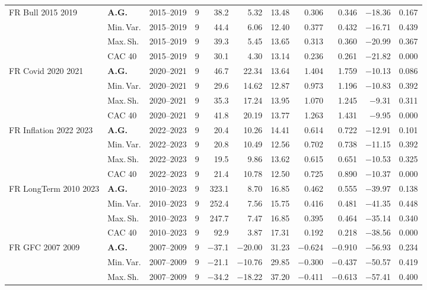 \begin{longtable}{p{2.6cm} l c c r r r r r r r}
FR Bull 2015 2019 & \textbf{A.G.} & 2015--2019 & 9 & 38.2 & 5.32 & 13.48 & 0.306 & 0.346 & $-$18.36 & 0.167 \\
 & Min.\,Var. & 2015--2019 & 9 & 44.4 & 6.06 & 12.40 & 0.377 & 0.432 & $-$16.71 & 0.439 \\
 & Max.\,Sh. & 2015--2019 & 9 & 39.3 & 5.45 & 13.65 & 0.313 & 0.360 & $-$20.99 & 0.367 \\
 & CAC 40 & 2015--2019 & 9 & 30.1 & 4.30 & 13.14 & 0.236 & 0.261 & $-$21.82 & 0.000 \\
\midrule
FR Covid 2020 2021 & \textbf{A.G.} & 2020--2021 & 9 & 46.7 & 22.34 & 13.64 & 1.404 & 1.759 & $-$10.13 & 0.086 \\
 & Min.\,Var. & 2020--2021 & 9 & 29.6 & 14.62 & 12.87 & 0.973 & 1.196 & $-$10.83 & 0.392 \\
 & Max.\,Sh. & 2020--2021 & 9 & 35.3 & 17.24 & 13.95 & 1.070 & 1.245 & $-$9.31 & 0.311 \\
 & CAC 40 & 2020--2021 & 9 & 41.8 & 20.19 & 13.77 & 1.263 & 1.431 & $-$9.95 & 0.000 \\
\midrule
FR Inflation 2022 2023 & \textbf{A.G.} & 2022--2023 & 9 & 20.4 & 10.26 & 14.41 & 0.614 & 0.722 & $-$12.91 & 0.101 \\
 & Min.\,Var. & 2022--2023 & 9 & 20.8 & 10.49 & 12.56 & 0.702 & 0.738 & $-$11.15 & 0.392 \\
 & Max.\,Sh. & 2022--2023 & 9 & 19.5 & 9.86 & 13.62 & 0.615 & 0.651 & $-$10.53 & 0.325 \\
 & CAC 40 & 2022--2023 & 9 & 21.4 & 10.78 & 12.50 & 0.725 & 0.890 & $-$10.37 & 0.000 \\
\midrule
FR LongTerm 2010 2023 & \textbf{A.G.} & 2010--2023 & 9 & 323.1 & 8.70 & 16.85 & 0.462 & 0.555 & $-$39.97 & 0.138 \\
 & Min.\,Var. & 2010--2023 & 9 & 252.4 & 7.56 & 15.75 & 0.416 & 0.481 & $-$41.35 & 0.448 \\
 & Max.\,Sh. & 2010--2023 & 9 & 247.7 & 7.47 & 16.85 & 0.395 & 0.464 & $-$35.14 & 0.340 \\
 & CAC 40 & 2010--2023 & 9 & 92.9 & 3.87 & 17.31 & 0.192 & 0.218 & $-$38.56 & 0.000 \\
\midrule
FR GFC 2007 2009 & \textbf{A.G.} & 2007--2009 & 9 & $-$37.1 & $-$20.00 & 31.23 & $-$0.624 & $-$0.910 & $-$56.93 & 0.234 \\
 & Min.\,Var. & 2007--2009 & 9 & $-$21.1 & $-$10.76 & 29.85 & $-$0.300 & $-$0.437 & $-$50.57 & 0.419 \\
 & Max.\,Sh. & 2007--2009 & 9 & $-$34.2 & $-$18.22 & 37.20 & $-$0.411 & $-$0.613 & $-$57.41 & 0.400 \\

\end{longtable}
